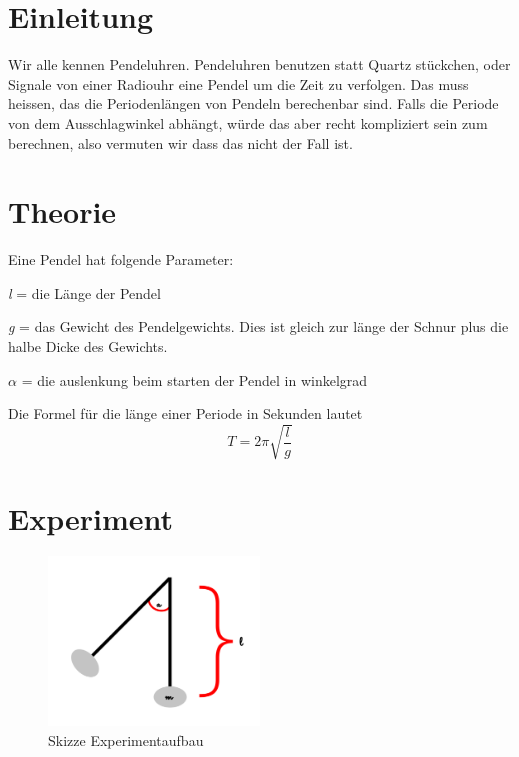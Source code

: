 \documentclass[12pt, a4paper, twoside]{article}
\begin{document}
\maketitlepage



\section{Einleitung}
Wir alle kennen Pendeluhren.
Pendeluhren benutzen statt Quartz stückchen, oder Signale von einer Radiouhr eine Pendel um die Zeit zu verfolgen.
Das muss heissen, das die Periodenlängen von Pendeln berechenbar sind.
Falls die Periode von dem Ausschlagwinkel abhängt, würde das aber recht kompliziert sein zum berechnen, also vermuten wir dass das nicht der Fall ist.

\section{Theorie}
Eine Pendel hat folgende Parameter:
\begin{list}{-}{}
  \item \emph{l} = die Länge der Pendel
  \item \emph{g} = das Gewicht des Pendelgewichts. Dies ist gleich zur länge der Schnur plus die halbe Dicke des Gewichts.
  \item \emph{$\alpha$} = die auslenkung beim starten der Pendel in winkelgrad
\end{list}

Die Formel für die länge einer Periode in Sekunden lautet
$$T=2\pi \sqrt{\frac{l}{g}}$$
\cite{FoTa}

\section{Experiment}
\begin{figure} [ht]
  \centering
  \includegraphics[width=0.5\textwidth]{Experimentaufbau.png}
  \caption{Skizze Experimentaufbau}
  \label{fig:experimentaufbau}
\end{figure}
\end{document}
